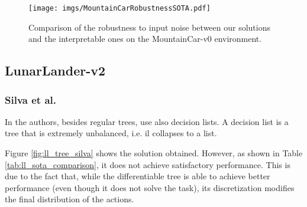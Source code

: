 \documentclass[review,english]{elsarticle}
\begin{document}
\begin{figure}[!ht]
    \centering
    \texttt{[image: imgs/MountainCarRobustnessSOTA.pdf]}
    \caption{Comparison of the robustness to input noise between our solutions and the interpretable ones on the MountainCar-v0 environment.}
    \label{fig:mc_noise_sota_comparison}
\end{figure}

\subsection{LunarLander-v2}
\subsubsection{Silva et al.}
In \cite{silva_optimization_2020} the authors, besides regular trees, use also decision lists.
A decision list is a tree that is extremely unbalanced, i.e. il collapses to a list.

Figure \ref{fig:ll_tree_silva} shows the solution obtained.
However, as shown in Table \ref{tab:ll_sota_comparison}, it does not achieve satisfactory performance.
This is due to the fact that, while the differentiable tree is able to achieve better performance (even though it does not solve the task), its discretization modifies the final distribution of the actions.
\end{document}

